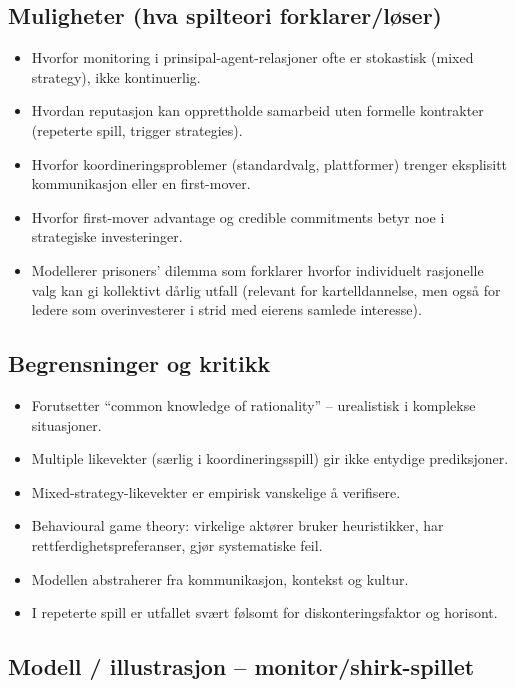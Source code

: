 \subsection*{Muligheter (hva spilteori forklarer/løser)}
\begin{itemize}
\item Hvorfor monitoring i prinsipal-agent-relasjoner ofte er stokastisk (mixed strategy), ikke kontinuerlig.
\item Hvordan reputasjon kan opprettholde samarbeid uten formelle kontrakter (repeterte spill, trigger strategies).
\item Hvorfor koordinerings\-problemer (standardvalg, plattformer) trenger eksplisitt kommunikasjon eller en first-mover.
\item Hvorfor first-mover advantage og credible commitments betyr noe i strategiske investeringer.
\item Modellerer prisoners' dilemma som forklarer hvorfor individuelt rasjonelle valg kan gi kollektivt dårlig utfall (relevant for kartelldannelse, men også for ledere som overinvesterer i strid med eierens samlede interesse).
\end{itemize}

\subsection*{Begrensninger og kritikk}
\begin{itemize}
\item Forutsetter ``common knowledge of rationality'' -- urealistisk i komplekse situasjoner.
\item Multiple likevekter (særlig i koordinerings\-spill) gir ikke entydige prediksjoner.
\item Mixed-strategy-likevekter er empirisk vanskelige å verifisere.
\item Behavioural game theory: virkelige aktører bruker heuristikker, har rettferdighets\-preferanser, gjør systematiske feil.
\item Modellen abstraherer fra kommunikasjon, kontekst og kultur.
\item I repeterte spill er utfallet svært følsomt for diskonteringsfaktor og horisont.
\end{itemize}

\subsection*{Modell / illustrasjon -- monitor/shirk-spillet}

